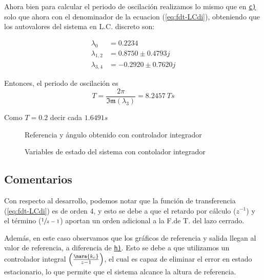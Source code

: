 Ahora bien para calcular el periodo de oscilación realizamos lo mismo que en \hyperref[pregunta-c]{\texttt{c)}} solo que ahora con el denominador de la ecuacion (\eqref{eq:fdt-LCdi}), obteniendo que los
autovalores del sistema en L.C. discreto son:

\begin{align*}
  \lambda_{0} &= 0.2234\\
  \lambda_{1,2} &= 0.8750 \pm 0.4793j\\
  \lambda_{3,4} &= -0.2920 \pm 0.7620j
\end{align*}


Entonces, el periodo de oscilación es
\begin{equation}
    T = \frac{2\pi}{\mathfrak{Im}(\lambda_{3})} = 8.2457\ \unit{T s} 
\end{equation}

Como $T= 0.2$ decir cada $1.6491 \unit{s}$ 


\begin{figure}[h]
    \centering
    
    \caption{Referencia y ángulo obtenido con controlador integrador}\label{fig:psi-int-disc}
  \end{figure}
  
  \begin{figure}[h]
    \centering
    
    \caption{Variables de estado del sistema con contolador integrador}\label{fig:estado-int-disc}
  \end{figure}
  
  \FloatBarrier


\subsection{Comentarios}

Con respecto al desarrollo, podemos notar que la función de transferencia (\eqref{eq:fdt-LCdi}) es de orden 4, y esto se debe a que el retardo por cálculo ($z^{-1}$) y el término ($\sfrac{1}{z-1}$) aportan un orden adicional a la F.de T. del lazo cerrado.

Además, en este caso observamos que los gráficos de referencia y salida llegan al valor de referencia, a diferencia de \hyperref[pregunta-h]{\texttt{h)}}. Esto se debe a que utilizamos un controlador integral $\left(\frac{\nara{k_c}}{z-1}\right)$, el cual es capaz de eliminar el error en estado estacionario, lo que permite que el sistema alcance la altura de referencia.


